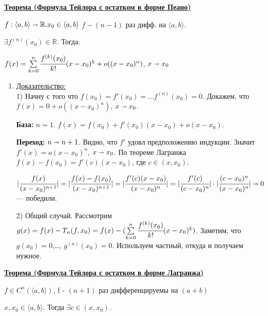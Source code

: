 \documentclass{article}
\newcommand{\thmm}[1]{\underline{\textbf{#1}}}
\newcommand{\prooff}[1]{{\underline{Доказательство:}} \\ }
\begin{document}

\thmm{Теорема (Формула Тейлора с остатком в форме Пеано)}

$f: \langle a,b \rangle \shortrightarrow \mathbb{R}. x_0 \in \langle a,b \rangle$ $f - (n-1)$ раз дифф. на $\langle a,b \rangle$.

$\exists f^{(n)}(x_0) \in \mathbb{R}.$ Тогда:

$f(x) = \sum\limits_{k=0}^n  \cfrac{f^{(k)}(x_0)}{k!}(x-x_0)^k + o((x-x_0)^n) $, $x\shortrightarrow x_0$

\begin{enumerate}
    \item[] \prooff{}
    1) Начну с того что $f(x_0) = f'(x_0) =\ldots f^(n)(x_0)=0$.  Докажем, что $f(x) = 0 + o((x-x_0)^n) $, $x \shortrightarrow x_0$.

    \textbf{База:} $n=1$. $f(x) = f(x_0) + f'(x_0)(x-x_0) + o(x-x_0)$.
    
    \textbf{Переход:}  $n \shortrightarrow n+1$. Видно, что $f'$ удовл предположению индукции. Значит $f'(x) = o(x-x_0)^{n}$, $x \shortrightarrow x_0$. По теореме Лагранжа $f(x) - f(x_0) = f'(c)(x-x_0)$, где $c \in (x, x_0)$.

    $|\cfrac{f(x)}{(x-x_0)^{n+1}}| = |\cfrac{f(x) - f(x_0)}{(x-x_0)^{n+1}}| = |\cfrac{ f'(c)(x-x_0)}{(x-x_0)^n}|= |\cfrac{f'(c)}{(c-x_0)^n}| \cdot |\cfrac{(c-x_0)^n}{(x-x_0)^n}| \shortrightarrow 0$ --- победили.

    2) Общий случай. Рассмотрим $g(x) = f(x) - T_n(f,x_0) = f(x) - (\sum\limits_{k=0}^n  \cfrac{f^{(k)}(x_0)}{k!}(x-x_0)^k)$. Заметим, что $g(x_0) = 0$,\ldots, $g^{(n)}(x_0)=0$. Используем частный, откуда и получаем нужное.

\end{enumerate}

\thmm{Теорема (Формула Тейлора с остатком в форме Лагранжа)}

$f \in C^n(\langle a,b \rangle )$, f - $(n+1)$ раз дифференцируемы на $(a+b)$


$x, x_0 \in \langle a,b\rangle$. Тогда $\exists c \in (x, x_0)$.
\end{document}

